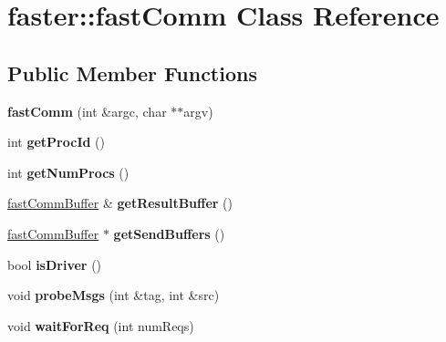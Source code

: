 \hypertarget{classfaster_1_1fastComm}{}\section{faster\+:\+:fast\+Comm Class Reference}
\label{classfaster_1_1fastComm}
\subsection*{Public Member Functions}
\begin{DoxyCompactItemize}
\item 
\hypertarget{classfaster_1_1fastComm_a2783608e26ab9d7afb185a3c27cdc8cf}{}\label{classfaster_1_1fastComm_a2783608e26ab9d7afb185a3c27cdc8cf} 
{\bfseries fast\+Comm} (int \&argc, char $\ast$$\ast$argv)
\item 
\hypertarget{classfaster_1_1fastComm_abc2ab1663dab2076556a165b2b709400}{}\label{classfaster_1_1fastComm_abc2ab1663dab2076556a165b2b709400} 
int {\bfseries get\+Proc\+Id} ()
\item 
\hypertarget{classfaster_1_1fastComm_adb5362e1b299df2bc3753dea326f603d}{}\label{classfaster_1_1fastComm_adb5362e1b299df2bc3753dea326f603d} 
int {\bfseries get\+Num\+Procs} ()
\item 
\hypertarget{classfaster_1_1fastComm_a8f53072a54ba41fa2854dd829312f1c9}{}\label{classfaster_1_1fastComm_a8f53072a54ba41fa2854dd829312f1c9} 
\hyperlink{classfaster_1_1fastCommBuffer}{fast\+Comm\+Buffer} \& {\bfseries get\+Result\+Buffer} ()
\item 
\hypertarget{classfaster_1_1fastComm_acd4b18c158437d46b8bfa5e6b1077d29}{}\label{classfaster_1_1fastComm_acd4b18c158437d46b8bfa5e6b1077d29} 
\hyperlink{classfaster_1_1fastCommBuffer}{fast\+Comm\+Buffer} $\ast$ {\bfseries get\+Send\+Buffers} ()
\item 
\hypertarget{classfaster_1_1fastComm_afab41f8b143b49d41150707b1665f33a}{}\label{classfaster_1_1fastComm_afab41f8b143b49d41150707b1665f33a} 
bool {\bfseries is\+Driver} ()
\item 
\hypertarget{classfaster_1_1fastComm_ae4989c905340be092381e00f2166d9bc}{}\label{classfaster_1_1fastComm_ae4989c905340be092381e00f2166d9bc} 
void {\bfseries probe\+Msgs} (int \&tag, int \&src)
\item 
\hypertarget{classfaster_1_1fastComm_a5a539bee13feec7bcb48d2aca3811bff}{}\label{classfaster_1_1fastComm_a5a539bee13feec7bcb48d2aca3811bff} 
void {\bfseries wait\+For\+Req} (int num\+Reqs)
\item 
$$
\end{DoxyCompactItemize}

